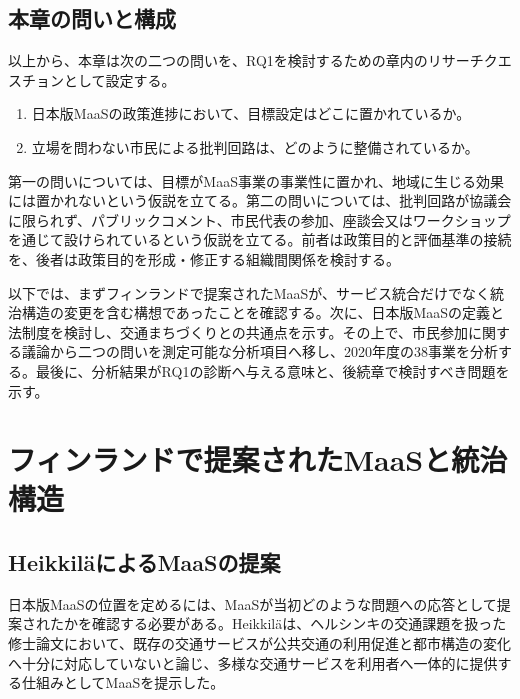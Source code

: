 \subsection{本章の問いと構成}
\label{subsec:ch4_questions}

以上から、本章は次の二つの問いを、RQ1を検討するための章内のリサーチクエスチョンとして設定する。

\begin{enumerate}
\item 日本版MaaSの政策進捗において、目標設定はどこに置かれているか。
\item 立場を問わない市民による批判回路は、どのように整備されているか。
\end{enumerate}

第一の問いについては、目標がMaaS事業の事業性に置かれ、地域に生じる効果には置かれないという仮説を立てる。第二の問いについては、批判回路が協議会に限られず、パブリックコメント、市民代表の参加、座談会又はワークショップを通じて設けられているという仮説を立てる。前者は政策目的と評価基準の接続を、後者は政策目的を形成・修正する組織間関係を検討する。

以下では、まずフィンランドで提案されたMaaSが、サービス統合だけでなく統治構造の変更を含む構想であったことを確認する。次に、日本版MaaSの定義と法制度を検討し、交通まちづくりとの共通点を示す。その上で、市民参加に関する議論から二つの問いを測定可能な分析項目へ移し、2020年度の38事業を分析する。最後に、分析結果がRQ1の診断へ与える意味と、後続章で検討すべき問題を示す。

\section{フィンランドで提案されたMaaSと統治構造}
\label{sec:ch4_finland_maas}

\subsection{HeikkiläによるMaaSの提案}
\label{subsec:ch4_initial_maas}

日本版MaaSの位置を定めるには、MaaSが当初どのような問題への応答として提案されたかを確認する必要がある。Heikkiläは、ヘルシンキの交通課題を扱った修士論文において、既存の交通サービスが公共交通の利用促進と都市構造の変化へ十分に対応していないと論じ、多様な交通サービスを利用者へ一体的に提供する仕組みとしてMaaSを提示した\cite{heikkila2014maas}。

